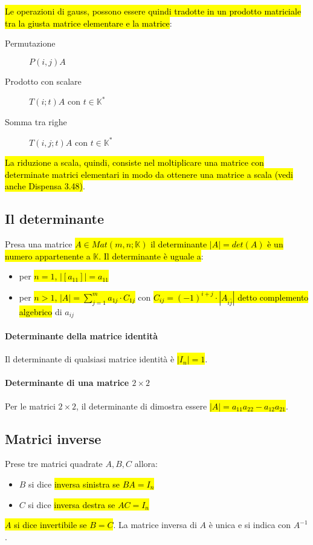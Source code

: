 \hl{Le operazioni di gauss, possono essere quindi tradotte in un prodotto matriciale
tra la giusta matrice elementare e la matrice}:
\begin{description}
    \item[Permutazione] $P(i,j)A$
    \item[Prodotto con scalare] $T(i; t)A$ con $t \in \mathbb{K}^*$
    \item[Somma tra righe] $T(i,j;t)A$ con $t \in \mathbb{K}^*$
\end{description}

\hl{La riduzione a scala, quindi, consiste nel moltiplicare una matrice con
determinate matrici elementari in modo da ottenere una matrice a scala 
(vedi anche Dispensa 3.48)}.

\subsection{Il determinante}
Presa una matrice \hl{$A \in Mat(m,n;\mathbb{K})$ il determinante $|A|=det(A)$ è un 
numero appartenente a $\mathbb{K}$. Il determinante è uguale a}:
\begin{itemize}
    \item per \hl{$n = 1$, $|[a_{11}]| = a_{11}$}
    \item per \hl{$n > 1$, $|A| = \sum_{j=1}^m a_{1j} \cdot C_{1j}$} con
        \hl{$C_{ij} = (-1)^{i+j} \cdot |A_{\hat{i}\hat{j}}|$ detto complemento 
        algebrico} di $a_{ij}$
\end{itemize}

\paragraph{Determinante della matrice identità} Il determinante di qualsiasi
matrice identità è \hl{$|I_n| = 1$}.

\paragraph{Determinante di una matrice $2 \times 2$} Per le matrici $2 \times 2$,
il determinante di dimostra essere \hl{$|A| = a_{11}a_{22} - a_{12}a_{21}$}.

\subsection{Matrici inverse}
Prese tre matrici quadrate $A, B, C$ allora:
\begin{itemize}
    \item $B$ si dice \hl{inversa sinistra se $BA = I_{n}$}
    \item $C$ si dice \hl{inversa destra se $AC = I_{n}$}
\end{itemize}
\hl{$A$ si dice invertibile se $B = C$}. La matrice inversa di $A$ è unica e
si indica con $A^{-1}$.

